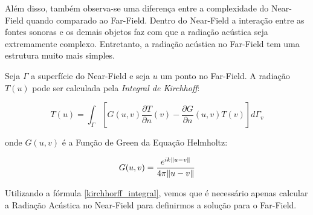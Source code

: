 Além disso, também observa-se uma diferença entre a complexidade do Near-Field quando comparado ao Far-Field. Dentro do Near-Field a interação entre as fontes sonoras e os demais objetos faz com que a radiação acústica seja extremamente complexo. Entretanto, a radiação acústica no Far-Field tem uma estrutura muito mais simples.

Seja $\Gamma$ a superfície do Near-Field e seja $u$ um ponto no Far-Field. A radiação $T(u)$ pode ser calculada pela \emph{Integral de Kirchhoff}:

\begin{equation}
	T(u) = \int_{\Gamma} \left[G(u, v)\frac{\partial T}{\partial n}(v) - \frac{\partial G}{\partial n}(u, v)T(v) \right] d\Gamma_v
	\label{kirchhorff_integral}
\end{equation}

onde $G(u, v)$ é a Função de Green da Equação Helmholtz:

\begin{equation}
	G(u, v) = \frac{e^{ik\lVert u-v\rVert}}{4\pi \lVert u-v\rVert}
\end{equation}

Utilizando a fórmula \eqref{kirchhorff_integral}, vemos que é necessário apenas calcular a Radiação Acústica no Near-Field para definirmos a solução para o Far-Field.
